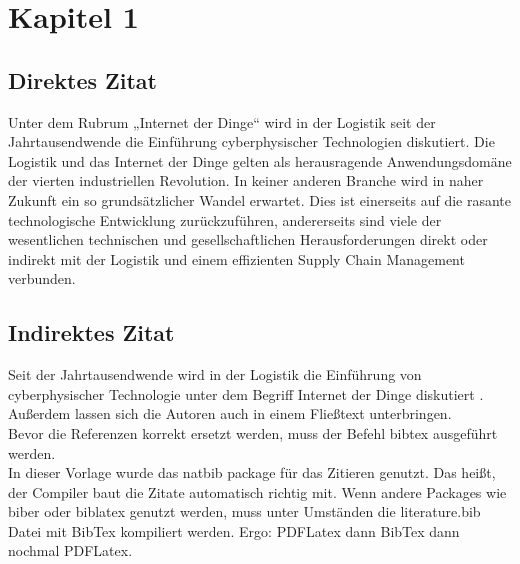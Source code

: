 \section{Kapitel 1}
\label{sec:Kapitel1}

\subsection{Direktes Zitat}
\glqq Unter dem Rubrum „Internet der Dinge“ wird in der Logistik seit der Jahrtausendwende die Einführung cyberphysischer Technologien diskutiert. Die Logistik und das Internet der Dinge gelten als herausragende Anwendungsdomäne der vierten industriellen Revolution. In keiner anderen Branche wird in naher Zukunft ein so grundsätzlicher Wandel erwartet. Dies ist einerseits auf die rasante technologische Entwicklung zurückzuführen, andererseits sind viele der wesentlichen technischen und gesellschaftlichen Herausforderungen direkt oder indirekt mit der Logistik und einem effizienten Supply Chain Management verbunden.\grqq \citep[S.~1]{tenHompel2014}

\subsection{Indirektes Zitat}
Seit der Jahrtausendwende wird in der Logistik die Einführung von cyberphysischer Technologie unter dem Begriff Internet der Dinge diskutiert \citep[S.~1]{tenHompel2014}. \\

Außerdem lassen sich die Autoren \citeauthor{tenHompel2014} auch in einem Fließtext unterbringen. \\

Bevor die Referenzen korrekt ersetzt werden, muss der Befehl bibtex ausgeführt werden. \\ 

In dieser Vorlage wurde das natbib package für das Zitieren genutzt. Das heißt, der Compiler baut die Zitate automatisch richtig mit. Wenn andere Packages wie biber oder biblatex genutzt werden, muss unter Umständen die literature.bib Datei mit BibTex kompiliert werden. Ergo: PDFLatex dann BibTex dann nochmal PDFLatex. 

